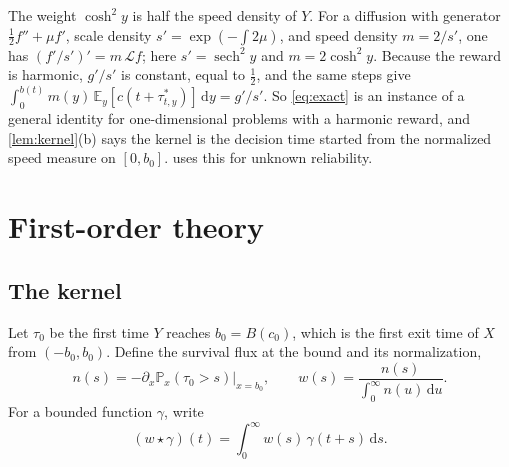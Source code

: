 \documentclass[11pt]{article}
\theoremstyle{definition}
\theoremstyle{remark}
\newcommand{\E}{\mathbb{E}}
\renewcommand{\P}{\mathbb{P}}
\newcommand{\dd}{\,\mathrm{d}}
\newcommand{\sech}{\operatorname{sech}}
\newcommand{\Lop}{\mathcal{L}}
\begin{document}
\begin{remark}
\label{rem:speed}
The weight $\cosh^2 y$ is half the speed density of $Y$. For a diffusion with generator
$\tfrac12 f'' + \mu f'$, scale density $s' = \exp(-\int 2\mu)$, and speed density $m = 2/s'$, one has
$(f'/s')' = m\,\Lop f$; here $s' = \sech^2 y$ and $m = 2\cosh^2 y$. Because the reward is harmonic,
$g'/s'$ is constant, equal to $\tfrac12$, and the same steps give
$\int_0^{b(t)} m(y)\,\E_y[c(t + \tau^*_{t,y})]\dd y = g'/s'$. So \eqref{eq:exact} is an instance
of a general identity for one-dimensional problems with a harmonic reward, and
\cref{lem:kernel}(b) says the kernel is the decision time started from the normalized speed
measure on $[0, b_0]$.  uses this for unknown reliability.
\end{remark}

\section{First-order theory}
\label{sec:first-order}

\subsection{The kernel}

Let $\tau_0$ be the first time $Y$ reaches $b_0 = B(c_0)$, which is the first exit time of $X$
from $(-b_0, b_0)$. Define the survival flux at the bound and its normalization,
\begin{equation}
  n(s) = -\partial_x \P_x(\tau_0 > s)\big|_{x = b_0}, \qquad
  w(s) = \frac{n(s)}{\int_0^\infty n(u)\dd u}.
  \label{eq:kernel}
\end{equation}
For a bounded function $\gamma$, write
\begin{equation}
  (w \star \gamma)(t) = \int_0^\infty w(s)\,\gamma(t+s)\dd s.
\end{equation}
\end{document}
